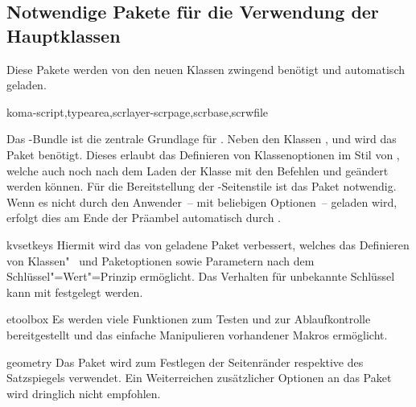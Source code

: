 \subsection{Notwendige Pakete für die Verwendung der Hauptklassen}
Diese Pakete werden von den neuen Klassen zwingend benötigt und automatisch 
geladen.
%
\begin{packages}
\item[koma-script,typearea,scrlayer-scrpage,scrbase,scrwfile]
  \begin{Declaration*}{}
  \begin{Declaration*}{}
  \begin{Declaration*}{}
  \begin{Declaration*}{}
  Das \KOMAScript-Bundle ist die zentrale Grundlage für \TUDScript. Neben den 
  Klassen ,  und  wird das Paket 
   benötigt. Dieses erlaubt das Definieren von Klassenoptionen 
  im Stil von \KOMAScript, welche auch noch nach dem Laden der Klasse mit den 
  Befehlen  und  geändert werden können. Für 
  die Bereitstellung der -Seitenstile ist das Paket 
   notwendig. Wenn es nicht durch den Anwender~-- mit 
  beliebigen Optionen~-- geladen wird, erfolgt dies am Ende der Präambel 
  automatisch durch \TUDScript.
  \end{Declaration*}
  \end{Declaration*}
  \end{Declaration*}
  \end{Declaration*}
\item[kvsetkeys]
  Hiermit wird das von  geladene Paket  
  verbessert, welches das Definieren von Klassen"~ und Paketoptionen sowie 
  Parametern nach dem Schlüssel"=Wert"=Prinzip ermöglicht. Das Verhalten für 
  unbekannte Schlüssel  kann mit  festgelegt werden.
\item[etoolbox]
  Es werden viele Funktionen zum Testen und zur Ablaufkontrolle bereitgestellt 
  und das einfache Manipulieren vorhandener Makros ermöglicht.
\item[geometry]%
  Das Paket wird zum Festlegen der Seitenränder respektive des Satzspiegels 
  verwendet. Ein Weiterreichen zusätzlicher Optionen an das Paket wird 
  dringlich nicht empfohlen.

\end{packages}

